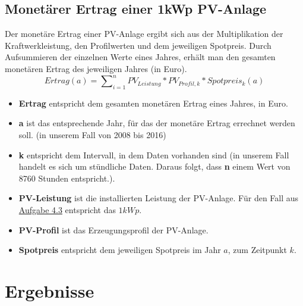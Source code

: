 \documentclass[a4paper,12pt]{article}
\begin{document}
	\subsection{Monetärer Ertrag einer 1kWp PV-Anlage}
	Der monetäre Ertrag einer PV-Anlage ergibt sich aus der Multiplikation der Kraftwerkleistung, den Profilwerten und dem jeweiligen Spotpreis. Durch Aufsummieren der einzelnen Werte eines Jahres, erhält man den gesamten monetären Ertrag des jeweiligen Jahres (in Euro).
	\begin{equation}
	Ertrag(a) = \sum\nolimits_{i=1}^n PV_{Leistung} * PV_{Profil,k} * Spotpreis_k(a)
	\end{equation}
	\begin{itemize}
		\item \textbf{Ertrag} entspricht dem gesamten monetären Ertrag eines Jahres, in Euro.
		\item \textbf{a} ist das entsprechende Jahr, für das der monetäre Ertrag errechnet werden soll. (in unserem Fall von 2008 bis 2016)
		\item \textbf{k} entspricht dem Intervall, in dem Daten vorhanden sind (in unserem Fall handelt es sich um stündliche Daten. Daraus folgt, dass \textbf{n} einem Wert von 8760 Stunden entspricht.).
		\item \textbf{PV-Leistung} ist die installierten Leistung der PV-Anlage. Für den Fall aus \hyperref[sec:Aufgabenstellung43]{Aufgabe 4.3} entspricht das $1kWp$.
		\item \textbf{PV-Profil} ist das Erzeugungsprofil der PV-Anlage.
		\item \textbf{Spotpreis} entspricht dem jeweiligen Spotpreis im Jahr $a$, zum Zeitpunkt $k$.
	\end{itemize}
	\newpage
	\section{Ergebnisse}
	\label{sec:Ergebnisse}
	
	\newpage
	\listoffigures
\end{document}
